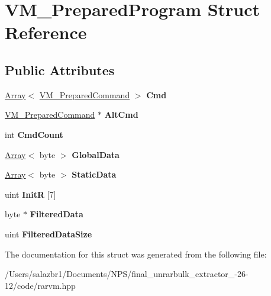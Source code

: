 \hypertarget{struct_v_m___prepared_program}{\section{V\-M\-\_\-\-Prepared\-Program Struct Reference}
\label{struct_v_m___prepared_program}
}
\subsection*{Public Attributes}
\begin{DoxyCompactItemize}
\item 
\hypertarget{struct_v_m___prepared_program_a54c5136bd73958a64606e3568c543a92}{\hyperlink{class_array}{Array}$<$ \hyperlink{struct_v_m___prepared_command}{V\-M\-\_\-\-Prepared\-Command} $>$ {\bfseries Cmd}}\label{struct_v_m___prepared_program_a54c5136bd73958a64606e3568c543a92}

\item 
\hypertarget{struct_v_m___prepared_program_a88c47f348c4f1b9a5469d3361827b376}{\hyperlink{struct_v_m___prepared_command}{V\-M\-\_\-\-Prepared\-Command} $\ast$ {\bfseries Alt\-Cmd}}\label{struct_v_m___prepared_program_a88c47f348c4f1b9a5469d3361827b376}

\item 
\hypertarget{struct_v_m___prepared_program_a43b01e89ea2d2ac6d3c30490fd27b008}{int {\bfseries Cmd\-Count}}\label{struct_v_m___prepared_program_a43b01e89ea2d2ac6d3c30490fd27b008}

\item 
\hypertarget{struct_v_m___prepared_program_a40936f34ce73f7d05701a2810778c226}{\hyperlink{class_array}{Array}$<$ byte $>$ {\bfseries Global\-Data}}\label{struct_v_m___prepared_program_a40936f34ce73f7d05701a2810778c226}

\item 
\hypertarget{struct_v_m___prepared_program_a3e7e7e9d4a094f129b1aabc31191a8b4}{\hyperlink{class_array}{Array}$<$ byte $>$ {\bfseries Static\-Data}}\label{struct_v_m___prepared_program_a3e7e7e9d4a094f129b1aabc31191a8b4}

\item 
\hypertarget{struct_v_m___prepared_program_a32e939a51a067a83084538b0c14bb515}{uint {\bfseries Init\-R} \mbox{[}7\mbox{]}}\label{struct_v_m___prepared_program_a32e939a51a067a83084538b0c14bb515}

\item 
\hypertarget{struct_v_m___prepared_program_aeae9193fc13999b6fe5f5db3e99c1d93}{byte $\ast$ {\bfseries Filtered\-Data}}\label{struct_v_m___prepared_program_aeae9193fc13999b6fe5f5db3e99c1d93}

\item 
\hypertarget{struct_v_m___prepared_program_ae07dc4e3c379d36c5dd9cdca6f47cb16}{uint {\bfseries Filtered\-Data\-Size}}\label{struct_v_m___prepared_program_ae07dc4e3c379d36c5dd9cdca6f47cb16}

\end{DoxyCompactItemize}


The documentation for this struct was generated from the following file\-:\begin{DoxyCompactItemize}
\item 
/\-Users/salazbr1/\-Documents/\-N\-P\-S/final\-\_\-unrarbulk\-\_\-extractor\-\_-\/26-\/12/code/rarvm.\-hpp\end{DoxyCompactItemize}
